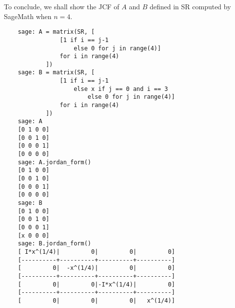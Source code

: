 \begin{example}
To conclude, we shall show the JCF of \(A\) and \(B\) defined in SR computed by SageMath when \(n = 4\).

\begin{verbatim}
    sage: A = matrix(SR, [
                [1 if i == j-1
                    else 0 for j in range(4)]
                for i in range(4)
            ])
    sage: B = matrix(SR, [
                [1 if i == j-1
                    else x if j == 0 and i == 3
                        else 0 for j in range(4)]
                for i in range(4)
            ])
    sage: A
    [0 1 0 0]
    [0 0 1 0]
    [0 0 0 1]
    [0 0 0 0]
    sage: A.jordan_form()
    [0 1 0 0]
    [0 0 1 0]
    [0 0 0 1]
    [0 0 0 0]
    sage: B
    [0 1 0 0]
    [0 0 1 0]
    [0 0 0 1]
    [x 0 0 0]
    sage: B.jordan_form()
    [ I*x^(1/4)|         0|         0|         0]
    [----------+----------+----------+----------]
    [         0|  -x^(1/4)|         0|         0]
    [----------+----------+----------+----------]
    [         0|         0|-I*x^(1/4)|         0]
    [----------+----------+----------+----------]
    [         0|         0|         0|   x^(1/4)]

\end{verbatim}

\end{example}